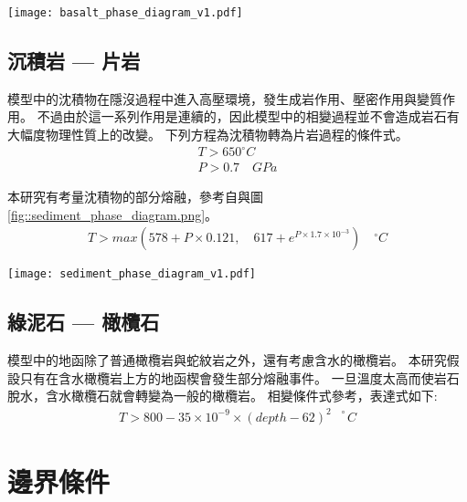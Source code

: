 \begin{figure*}[ht!]
    \centering
    \texttt{[image: basalt\_phase\_diagram\_v1.pdf]}
    \caption{鎂鐵質岩相圖，綠線隔開玄武岩與榴輝岩的穩定場，改編自\citealp{Hacker2003}，橘線為鎂鐵質岩的濕固相線(wet solidus)，改編自\citealp{Gutscher2000Bcan}}
    \label{fig::basalt_phase_diagram}
\end{figure*}

\subsection{沉積岩 --- 片岩}
模型中的沈積物在隱沒過程中進入高壓環境，發生成岩作用、壓密作用與變質作用。
不過由於這一系列作用是連續的，因此模型中的相變過程並不會造成岩石有大幅度物理性質上的改變。
下列方程為沈積物轉為片岩過程的條件式。
\begin{align}
T > 650^{\circ} C\\
P >  0.7 \quad GPa 
\end{align}

本研究有考量沈積物的部分熔融，參考自\citealp{Forster2021}與圖\ref{fig::sediment_phase_diagram.png}。
\begin{align}
    T > max (578+ P \times 0.121,  \quad 617+e^{P\times 1.7\times 10^{-3}}) \quad ^{\circ} C
\end{align}

\begin{figure*}[ht!]
    \centering
    \texttt{[image: sediment\_phase\_diagram\_v1.pdf]}
    \caption{沈積物變質岩相圖，橘線為沈積物濕固相線，改編自\citealp{Forster2021}。}
    \label{fig::sediment_phase_diagram.png}
\end{figure*}


\subsection{綠泥石 --- 橄欖石}

模型中的地函除了普通橄欖岩與蛇紋岩之外，還有考慮含水的橄欖岩。
本研究假設只有在含水橄欖岩上方的地函楔會發生部分熔融事件。
一旦溫度太高而使岩石脫水，含水橄欖石就會轉變為一般的橄欖岩。
相變條件式參考\citealp{Grove2009}，表達式如下:
\begin{align}
T > 800-35\times 10^{-9}\times (depth-62)^{2  \quad \circ}C
\end{align}

\section{邊界條件}

